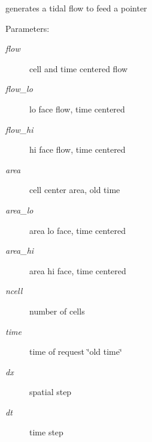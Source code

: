 generates a tidal flow to feed a pointer 

\begin{Desc}
\item[Parameters:]
\begin{description}
\item[{\em flow}]cell and time centered flow\item[{\em flow\_\-lo}]lo face flow, time centered\item[{\em flow\_\-hi}]hi face flow, time centered\item[{\em area}]cell center area, old time\item[{\em area\_\-lo}]area lo face, time centered\item[{\em area\_\-hi}]area hi face, time centered\item[{\em ncell}]number of cells\item[{\em time}]time of request \char`\"{}old time\char`\"{}\item[{\em dx}]spatial step \item[{\em dt}]time step \end{description}
\end{Desc}
